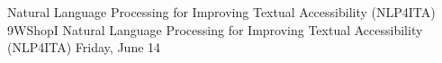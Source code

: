 \begin{wsschedule}
{Natural Language Processing for Improving Textual Accessibility (NLP4ITA)}
{9}{WShopI}
{Natural Language Processing for Improving Textual Accessibility (NLP4ITA)}
{Friday, June 14}{\WShopLocI}

\end{wsschedule}
